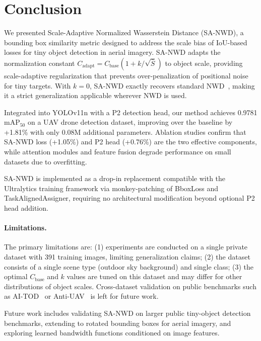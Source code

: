 \documentclass[journal]{IEEEtran}
\begin{document}
\section{Conclusion}
\label{sec:conclusion}

We presented Scale-Adaptive Normalized Wasserstein Distance (SA-NWD), a bounding box similarity metric designed to address the scale bias of IoU-based losses for tiny object detection in aerial imagery. SA-NWD adapts the normalization constant $C_{\text{adapt}} = C_{\text{base}}(1+k/\sqrt{\bar{S}})$ to object scale, providing scale-adaptive regularization that prevents over-penalization of positional noise for tiny targets. With $k=0$, SA-NWD exactly recovers standard NWD~\cite{wang2022nwd}, making it a strict generalization applicable wherever NWD is used.

Integrated into YOLOv11n with a P2 detection head, our method achieves 0.9781 mAP$_{50}$ on a UAV drone detection dataset, improving over the baseline by +1.81\% with only 0.08M additional parameters. Ablation studies confirm that SA-NWD loss (+1.05\%) and P2 head (+0.76\%) are the two effective components, while attention modules and feature fusion degrade performance on small datasets due to overfitting.

SA-NWD is implemented as a drop-in replacement compatible with the Ultralytics training framework via monkey-patching of BboxLoss and TaskAlignedAssigner, requiring no architectural modification beyond optional P2 head addition.

\paragraph{Limitations.} The primary limitations are: (1) experiments are conducted on a single private dataset with 391 training images, limiting generalization claims; (2) the dataset consists of a single scene type (outdoor sky background) and single class; (3) the optimal $C_{\text{base}}$ and $k$ values are tuned on this dataset and may differ for other distributions of object scales. Cross-dataset validation on public benchmarks such as AI-TOD~\cite{wang2022aitod} or Anti-UAV~\cite{zhao2022anti} is left for future work.

Future work includes validating SA-NWD on larger public tiny-object detection benchmarks, extending to rotated bounding boxes for aerial imagery, and exploring learned bandwidth functions conditioned on image features.



\end{document}
